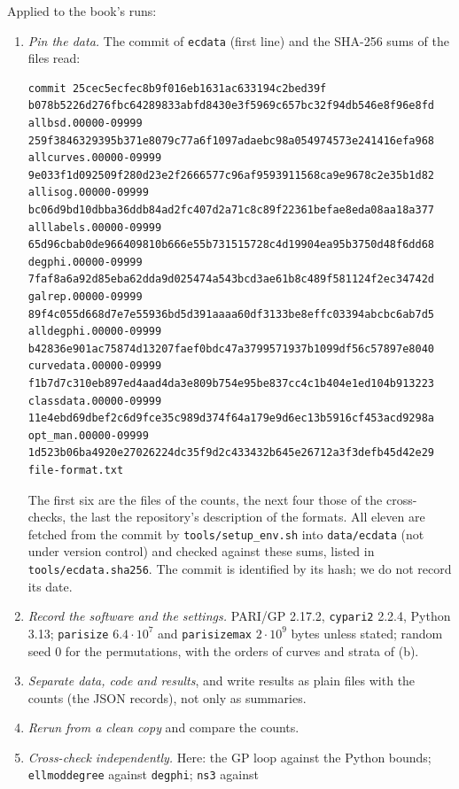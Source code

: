 \begin{sloppypar}
\begin{convention}\label{conv:computation:checklist}
Applied to the book's runs:
\begin{enumerate}[label=(\arabic*)]
\item \emph{Pin the data.} The commit of \texttt{ecdata} (first line) and the SHA-256 sums of the files read:
\begin{lstlisting}[basicstyle=\ttfamily\scriptsize]
commit 25cec5ecfec8b9f016eb1631ac633194c2bed39f
b078b5226d276fbc64289833abfd8430e3f5969c657bc32f94db546e8f96e8fd  allbsd.00000-09999
259f3846329395b371e8079c77a6f1097adaebc98a054974573e241416efa968  allcurves.00000-09999
9e033f1d092509f280d23e2f2666577c96af9593911568ca9e9678c2e35b1d82  allisog.00000-09999
bc06d9bd10dbba36ddb84ad2fc407d2a71c8c89f22361befae8eda08aa18a377  alllabels.00000-09999
65d96cbab0de966409810b666e55b731515728c4d19904ea95b3750d48f6dd68  degphi.00000-09999
7faf8a6a92d85eba62dda9d025474a543bcd3ae61b8c489f581124f2ec34742d  galrep.00000-09999
89f4c055d668d7e7e55936bd5d391aaaa60df3133be8effc03394abcbc6ab7d5  alldegphi.00000-09999
b42836e901ac75874d13207faef0bdc47a3799571937b1099df56c57897e8040  curvedata.00000-09999
f1b7d7c310eb897ed4aad4da3e809b754e95be837cc4c1b404e1ed104b913223  classdata.00000-09999
11e4ebd69dbef2c6d9fce35c989d374f64a179e9d6ec13b5916cf453acd9298a  opt_man.00000-09999
1d523b06ba4920e27026224dc35f9d2c433432b645e26712a3f3defb45d42e29  file-format.txt
\end{lstlisting}
The first six are the files of the counts, the next four those of the cross-checks, the last the repository's description of the formats. All
eleven are fetched from the commit by \texttt{tools/setup\_env.sh} into \texttt{data/ecdata} (not under version control) and checked against
these sums, listed in \texttt{tools/ecdata.sha256}. The commit is identified by its hash; we do not record its date.
\item \emph{Record the software and the settings.} PARI/GP 2.17.2, \texttt{cypari2} 2.2.4, Python 3.13; \texttt{parisize} $6.4\cdot10^7$ and \texttt{parisizemax} $2\cdot10^9$
bytes unless stated; random seed $0$ for the permutations, with the orders of curves and strata of (b).
\item \emph{Separate data, code and results}, and write results as plain files with the counts (the JSON records), not only as summaries.
\item \emph{Rerun from a clean copy} and compare the counts.
\item \emph{Cross-check independently.} Here: the GP loop against the Python bounds; \texttt{ellmoddegree} against \texttt{degphi}; \texttt{ns3} against

\end{enumerate}
\end{convention}
\end{sloppypar}
